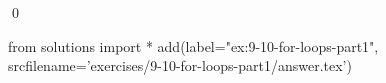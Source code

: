 
\begin{ex}
  \label{ex:9-10-for-loops-part1}
  
  \qed
\end{ex}
\begin{python0}
from solutions import *
add(label="ex:9-10-for-loops-part1",
    srcfilename='exercises/9-10-for-loops-part1/answer.tex')
\end{python0}

